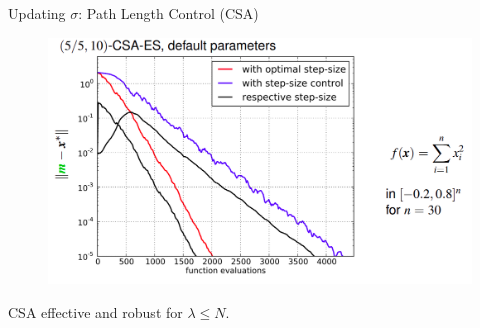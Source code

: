 \documentclass[11pt,compress,t,notes=noshow, xcolor=table]{beamer}
\begin{document}
%
%
%
%
%
%
%
\begin{vbframe}{Updating $\sigma$: Path Length Control (CSA)}
\begin{figure}
  \includegraphics[width=1\textwidth, height=0.7\textheight]{figure_man/cmaes/cmaes_step-size.png}
\end{figure}

CSA effective and robust for $\lambda \leq N$.

\end{vbframe}
\end{document}
